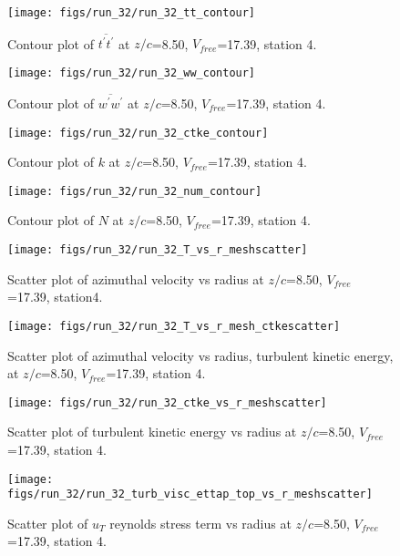 \begin{figure}[H]
\centering
\texttt{[image: figs/run\_32/run\_32\_tt\_contour]}
\caption{Contour plot of $\overline{t^\prime t^\prime}$ at $z/c$=8.50, $V_{free}$=17.39, station 4.}
\end{figure}


\begin{figure}[H]
\centering
\texttt{[image: figs/run\_32/run\_32\_ww\_contour]}
\caption{Contour plot of $\overline{w^\prime w^\prime}$ at $z/c$=8.50, $V_{free}$=17.39, station 4.}
\end{figure}


\begin{figure}[H]
\centering
\texttt{[image: figs/run\_32/run\_32\_ctke\_contour]}
\caption{Contour plot of $k$ at $z/c$=8.50, $V_{free}$=17.39, station 4.}
\end{figure}


\begin{figure}[H]
\centering
\texttt{[image: figs/run\_32/run\_32\_num\_contour]}
\caption{Contour plot of $N$ at $z/c$=8.50, $V_{free}$=17.39, station 4.}
\end{figure}


\begin{figure}[H]
\centering
\texttt{[image: figs/run\_32/run\_32\_T\_vs\_r\_meshscatter]}
\caption{Scatter plot of azimuthal velocity vs radius at $z/c$=8.50, $V_{free}$=17.39, station4.}
\end{figure}


\begin{figure}[H]
\centering
\texttt{[image: figs/run\_32/run\_32\_T\_vs\_r\_mesh\_ctkescatter]}
\caption{Scatter plot of azimuthal velocity vs radius, turbulent kinetic energy, at $z/c$=8.50, $V_{free}$=17.39, station 4.}
\end{figure}


\begin{figure}[H]
\centering
\texttt{[image: figs/run\_32/run\_32\_ctke\_vs\_r\_meshscatter]}
\caption{Scatter plot of turbulent kinetic energy vs radius at $z/c$=8.50, $V_{free}$=17.39, station 4.}
\end{figure}


\begin{figure}[H]
\centering
\texttt{[image: figs/run\_32/run\_32\_turb\_visc\_ettap\_top\_vs\_r\_meshscatter]}
\caption{Scatter plot of $
u_T$ reynolds stress term vs radius at $z/c$=8.50, $V_{free}$=17.39, station 4.}
\end{figure}


